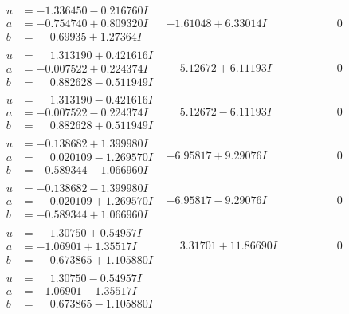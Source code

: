 \documentclass[1p]{elsarticle_modified}
\theoremstyle{definition}
\begin{document}
$$\begin{array}{c|c|c}
\begin{aligned}
u &= -1.336450 - 0.216760 I \\
a &= -0.754740 + 0.809320 I \\
b &= \phantom{-}0.69935 + 1.27364 I\end{aligned}
 & -1.61048 + 6.33014 I & \phantom{-0.000000 } 0 \\ \hline\begin{aligned}
u &= \phantom{-}1.313190 + 0.421616 I \\
a &= -0.007522 + 0.224374 I \\
b &= \phantom{-}0.882628 - 0.511949 I\end{aligned}
 & \phantom{-}5.12672 + 6.11193 I & \phantom{-0.000000 } 0 \\ \hline\begin{aligned}
u &= \phantom{-}1.313190 - 0.421616 I \\
a &= -0.007522 - 0.224374 I \\
b &= \phantom{-}0.882628 + 0.511949 I\end{aligned}
 & \phantom{-}5.12672 - 6.11193 I & \phantom{-0.000000 } 0 \\ \hline\begin{aligned}
u &= -0.138682 + 1.399980 I \\
a &= \phantom{-}0.020109 - 1.269570 I \\
b &= -0.589344 - 1.066960 I\end{aligned}
 & -6.95817 + 9.29076 I & \phantom{-0.000000 } 0 \\ \hline\begin{aligned}
u &= -0.138682 - 1.399980 I \\
a &= \phantom{-}0.020109 + 1.269570 I \\
b &= -0.589344 + 1.066960 I\end{aligned}
 & -6.95817 - 9.29076 I & \phantom{-0.000000 } 0 \\ \hline\begin{aligned}
u &= \phantom{-}1.30750 + 0.54957 I \\
a &= -1.06901 + 1.35517 I \\
b &= \phantom{-}0.673865 + 1.105880 I\end{aligned}
 & \phantom{-}3.31701 + 11.86690 I & \phantom{-0.000000 } 0 \\ \hline\begin{aligned}
u &= \phantom{-}1.30750 - 0.54957 I \\
a &= -1.06901 - 1.35517 I \\
b &= \phantom{-}0.673865 - 1.105880 I\end{aligned}

\end{array}$$
\end{document}
